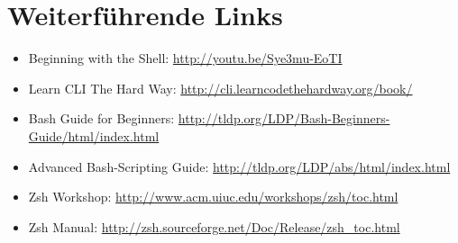 \section{Weiterführende Links}
\begin{itemize}
  \item Beginning with the Shell: \url{http://youtu.be/Sye3mu-EoTI}
  \item Learn CLI The Hard Way: \url{http://cli.learncodethehardway.org/book/}
  \item Bash Guide for Beginners: \url{http://tldp.org/LDP/Bash-Beginners-Guide/html/index.html}
  \item Advanced Bash-Scripting Guide: \url{http://tldp.org/LDP/abs/html/index.html}
  \item Zsh Workshop: \url{http://www.acm.uiuc.edu/workshops/zsh/toc.html}
  \item Zsh Manual: \url{http://zsh.sourceforge.net/Doc/Release/zsh\_toc.html}
\end{itemize}
